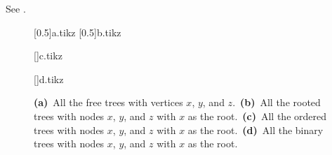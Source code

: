 See .
\begin{figure}[!htb]
    \subcaptionbox{\label{fig:B.5-1a}}[0.5\textwidth]{{a.tikz}}
    \subcaptionbox{\label{fig:B.5-1b}}[0.5\textwidth]{{b.tikz}}
    \par\vspace{10mm}
    \subcaptionbox{\label{fig:B.5-1c}}[\textwidth]{{c.tikz}}
    \par\vspace{10mm}
    \subcaptionbox{\label{fig:B.5-1d}}[\textwidth]{{d.tikz}}
    \caption{\textbf{(a)}\, All the free trees with vertices $x$, $y$, and $z$.\,
    \textbf{(b)}\, All the rooted trees with nodes $x$, $y$, and $z$ with $x$ as the root.\,
    \textbf{(c)}\, All the ordered trees with nodes $x$, $y$, and $z$ with $x$ as the root.\,
    \textbf{(d)}\, All the binary trees with nodes $x$, $y$, and $z$ with $x$ as the root.} \label{fig:B.5-1}
\end{figure}
